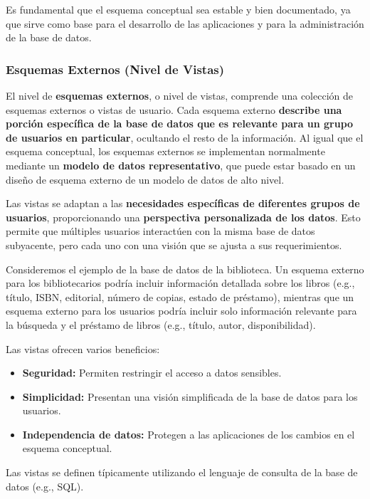 Es fundamental que el esquema conceptual sea estable y bien documentado, ya que sirve como base para el desarrollo de las aplicaciones y para la administración de la base de datos.

\subsubsection{Esquemas Externos (Nivel de Vistas)}

El nivel de \textbf{esquemas externos}, o nivel de vistas, comprende una colección de esquemas externos o vistas de usuario. Cada esquema externo \textbf{describe una porción específica de la base de datos que es relevante para un grupo de usuarios en particular}, ocultando el resto de la información. Al igual que el esquema conceptual, los esquemas externos se implementan normalmente mediante un \textbf{modelo de datos representativo}, que puede estar basado en un diseño de esquema externo de un modelo de datos de alto nivel.

Las vistas se adaptan a las \textbf{necesidades específicas de diferentes grupos de usuarios}, proporcionando una \textbf{perspectiva personalizada de los datos}. Esto permite que múltiples usuarios interactúen con la misma base de datos subyacente, pero cada uno con una visión que se ajusta a sus requerimientos.

Consideremos el ejemplo de la base de datos de la biblioteca. Un esquema externo para los bibliotecarios podría incluir información detallada sobre los libros (e.g., título, ISBN, editorial, número de copias, estado de préstamo), mientras que un esquema externo para los usuarios podría incluir solo información relevante para la búsqueda y el préstamo de libros (e.g., título, autor, disponibilidad).

Las vistas ofrecen varios beneficios:

\begin{itemize}
    \item \textbf{Seguridad:} Permiten restringir el acceso a datos sensibles.
    \item \textbf{Simplicidad:} Presentan una visión simplificada de la base de datos para los usuarios.
    \item \textbf{Independencia de datos:}  Protegen a las aplicaciones de los cambios en el esquema conceptual.
\end{itemize}

Las vistas se definen típicamente utilizando el lenguaje de consulta de la base de datos (e.g., SQL).


